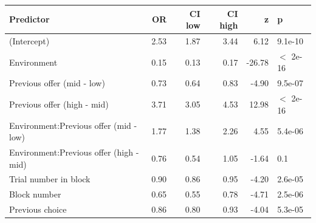 \begin{table}[ht]
\centering
\begin{tabular}{lrrrrl}
  \hline
Predictor & OR & CI low & CI high & z & p \\ 
  \hline
(Intercept) & 2.53 & 1.87 & 3.44 & 6.12 & 9.1e-10 \\ 
  Environment & 0.15 & 0.13 & 0.17 & -26.78 & $<$ 2e-16 \\ 
  Previous offer (mid - low) & 0.73 & 0.64 & 0.83 & -4.90 & 9.5e-07 \\ 
  Previous offer (high - mid) & 3.71 & 3.05 & 4.53 & 12.98 & $<$ 2e-16 \\ 
  Environment:Previous offer (mid - low) & 1.77 & 1.38 & 2.26 & 4.55 & 5.4e-06 \\ 
  Environment:Previous offer (high - mid) & 0.76 & 0.54 & 1.05 & -1.64 & 0.1 \\ 
  Trial number in block & 0.90 & 0.86 & 0.95 & -4.20 & 2.6e-05 \\ 
  Block number & 0.65 & 0.55 & 0.78 & -4.71 & 2.5e-06 \\ 
  Previous choice & 0.86 & 0.80 & 0.93 & -4.04 & 5.3e-05 \\ 
   \hline
\end{tabular}
\end{table}
